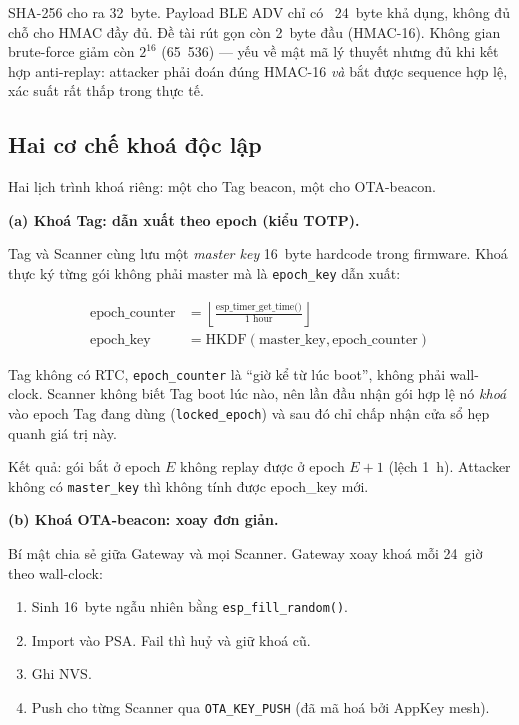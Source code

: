 SHA-256 cho ra 32~byte. Payload BLE ADV chỉ có ~24~byte khả dụng, không đủ chỗ cho HMAC đầy đủ. Đề tài rút gọn còn 2~byte đầu (HMAC-16). Không gian brute-force giảm còn $2^{16}$ (65~536) --- yếu về mật mã lý thuyết nhưng đủ khi kết hợp anti-replay: attacker phải đoán đúng HMAC-16 \textit{và} bắt được sequence hợp lệ, xác suất rất thấp trong thực tế.

\subsection{Hai cơ chế khoá độc lập}

Hai lịch trình khoá riêng: một cho Tag beacon, một cho OTA-beacon.

\textbf{(a) Khoá Tag: dẫn xuất theo epoch (kiểu TOTP).}

Tag và Scanner cùng lưu một \textit{master key} 16~byte hardcode trong firmware. Khoá thực ký từng gói không phải master mà là \texttt{epoch\_key} dẫn xuất:

\begin{align}
    \text{epoch\_counter} &= \left\lfloor \frac{\text{esp\_timer\_get\_time()}}{1\text{~hour}} \right\rfloor \\
    \text{epoch\_key} &= \text{HKDF}(\text{master\_key}, \text{epoch\_counter})
\end{align}

Tag không có RTC, \texttt{epoch\_counter} là ``giờ kể từ lúc boot'', không phải wall-clock. Scanner không biết Tag boot lúc nào, nên lần đầu nhận gói hợp lệ nó \textit{khoá} vào epoch Tag đang dùng (\texttt{locked\_epoch}) và sau đó chỉ chấp nhận cửa sổ hẹp quanh giá trị này.

Kết quả: gói bắt ở epoch $E$ không replay được ở epoch $E+1$ (lệch 1~h). Attacker không có \texttt{master\_key} thì không tính được epoch\_key mới.

\textbf{(b) Khoá OTA-beacon: xoay đơn giản.}

Bí mật chia sẻ giữa Gateway và mọi Scanner. Gateway xoay khoá mỗi 24~giờ theo wall-clock:

\begin{enumerate}
    \item Sinh 16~byte ngẫu nhiên bằng \texttt{esp\_fill\_random()}.
    \item Import vào PSA. Fail thì huỷ và giữ khoá cũ.
    \item Ghi NVS.
    \item Push cho từng Scanner qua \texttt{OTA\_KEY\_PUSH} (đã mã hoá bởi AppKey mesh).
\end{enumerate}

